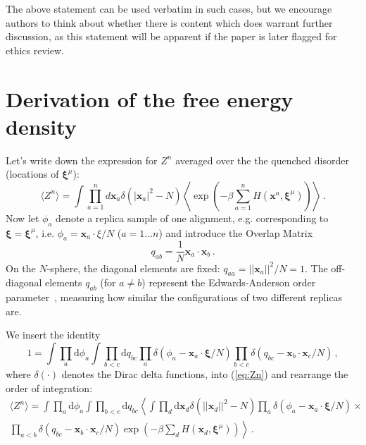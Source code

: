 \documentclass{article}
\newcommand{\dd}{{\mathrm{d}}}
\theoremstyle{plain}
\theoremstyle{definition}
\theoremstyle{remark}
\begin{document}
The above statement can be used verbatim in such cases, but we encourage
authors to think about whether there is content which does warrant further
discussion, as this statement will be apparent if the paper is later flagged
for ethics review.

\nocite{langley00}




\newpage
\appendix
\onecolumn
\section{Derivation of the free energy density}

Let's write down the expression for $Z^n$ averaged over the the quenched disorder (locations of $\bm{\xi}^\mu$):
\begin{equation}
    \langle Z^n \rangle = \int \prod_{a=1}^n d\bm{x}_a \delta(|\bm{x}_a|^2 - N) \left\langle \exp\left(-\beta \sum_{a=1}^n H(\bm{x}^a, \bm{\xi}^\mu)\right) \right\rangle\,.
    \label{eq:Zn}
\end{equation}
Now let $\phi_a$ denote a replica sample of one alignment, e.g. corresponding to $\bm{\xi} = \bm{\xi}^\mu$, i.e. $\phi_a = \bm{x}_a \cdot \xi /N$ ($a=1\dots n$) and introduce the Overlap Matrix 
\begin{equation}
    q_{ab} = \frac{1}{N} \bm{x}_a \cdot \bm{x}_b\,.
\end{equation}
On the $N$-sphere, the diagonal elements are fixed: $q_{aa} =  ||\bm{x}_a||^2/N = 1$. The off-diagonal elements $q_{ab}$ (for $a \neq b$) represent the Edwards-Anderson order parameter~\cite{ea75}, measuring how similar the configurations of two different replicas are.

We insert the identity 
\begin{equation}
1 = \int \prod_a \dd \phi_a \int \prod_{b<c} \dd q_{bc} \prod_a \delta\left(\phi_a - \bm{x}_a \cdot \bm{\xi}/N\right) \prod_{b<c} \delta\left(q_{bc} - \bm{x}_b \cdot \bm{x}_c/N\right)\,,
\end{equation}
where $\delta(\cdot)$ denotes the Dirac delta functions, into (\ref{eq:Zn}) and rearrange the order of integration:
\begin{multline}
\langle Z^n \rangle = \int \prod_a \dd \phi_a \int \prod_{b<c}  \dd q_{bc} \left\langle \int \prod_d \dd \bm{x}_d \delta(||\bm{x}_d||^2 - N) \prod_a \delta(\phi_a - \bm{x}_a \cdot \bm{\xi}/N) \right. \times \\
\left. \prod_{a<b} \delta(q_{bc} - \bm{x}_b \cdot \bm{x}_c/N) \exp\left(-\beta \sum_d H(\bm{x}_d, \bm{\xi}^\mu)\right) \right\rangle \,.
\end{multline}
\end{document}
